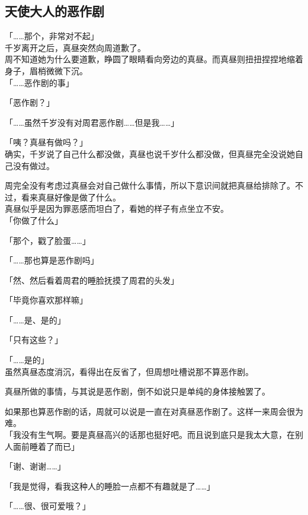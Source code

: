 \subsection{天使大人的恶作剧}

「……那个，非常对不起」\\

千岁离开之后，真昼突然向周道歉了。\\

周不知道她为什么要道歉，睁圆了眼睛看向旁边的真昼。而真昼则扭扭捏捏地缩着身子，眉梢微微下沉。\\

「……恶作剧的事」

「恶作剧？」

「……虽然千岁没有对周君恶作剧……但是我……」

「咦？真昼有做吗？」\\

确实，千岁说了自己什么都没做，真昼也说千岁什么都没做，但真昼完全没说她自己没有做过。

周完全没有考虑过真昼会对自己做什么事情，所以下意识间就把真昼给排除了。不过，看来真昼好像是做了什么。\\

真昼似乎是因为罪恶感而坦白了，看她的样子有点坐立不安。\\

「你做了什么」

「那个，戳了脸蛋……」

「……那也算是恶作剧吗」

「然、然后看着周君的睡脸抚摸了周君的头发」

「毕竟你喜欢那样嘛」

「……是、是的」

「只有这些？」

「……是的」\\

虽然真昼态度消沉，看得出在反省了，但周想吐槽说那不算恶作剧。

真昼所做的事情，与其说是恶作剧，倒不如说只是单纯的身体接触罢了。

如果那也算恶作剧的话，周就可以说是一直在对真昼恶作剧了。这样一来周会很为难。\\

「我没有生气啊。要是真昼高兴的话那也挺好吧。而且说到底只是我太大意，在别人面前睡着了而已」

「谢、谢谢……」

「我是觉得，看我这种人的睡脸一点都不有趣就是了……」

「……很、很可爱哦？」

